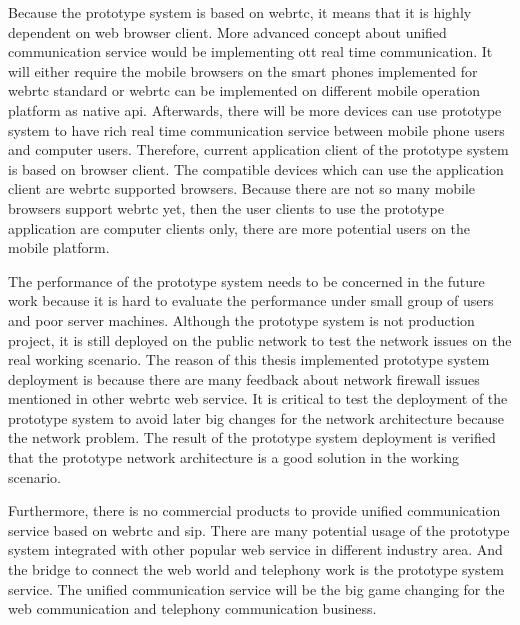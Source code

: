 \par Because the prototype system is based on \gls{webrtc}, it means that it is highly dependent on web browser client. More advanced concept about unified communication service would be implementing \gls{ott} real time communication. It will either require the mobile browsers on the smart phones implemented for \gls{webrtc} standard or \gls{webrtc} can be implemented on different mobile operation platform as native \gls{api}. Afterwards, there will be more devices can use prototype system to have rich real time communication service between mobile phone users and computer users. Therefore, current application client of the prototype system is based on browser client. The compatible devices which can use the application client are \gls{webrtc} supported browsers. Because there are not so many mobile browsers support \gls{webrtc} yet, then the user clients to use the prototype application are computer clients only, there are more potential users on the mobile platform.

\par The performance of the prototype system needs to be concerned in the future work because it is hard to evaluate the performance under small group of users and poor server machines. Although the prototype system is not production project, it is still deployed on the public network to test the network issues on the real working scenario. The reason of this thesis implemented prototype system deployment is because there are many feedback about network firewall issues mentioned in other \gls{webrtc} web service. It is critical to test the deployment of the prototype system to avoid later big changes for the network architecture because the network problem. The result of the prototype system deployment is verified that the prototype network architecture is a good solution in the working scenario.

\par Furthermore, there is no commercial products to provide unified communication service based on \gls{webrtc} and \gls{sip}. There are many potential usage of the prototype system integrated with other popular web service in different industry area. And the bridge to connect the web world and telephony work is the prototype system service. The unified communication service will be the big game changing for the web communication and telephony communication business.
